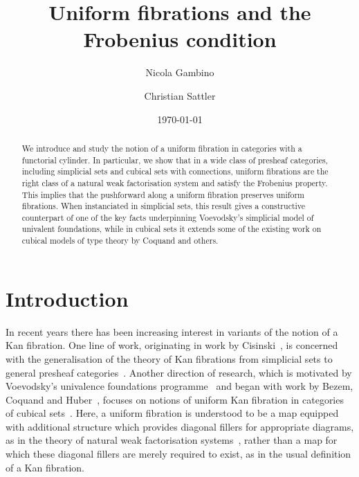 \documentclass[reqno,10pt,a4paper,oneside,draft]{amsart}
\title{Uniform fibrations and the Frobenius condition}
\begin{document}
\begin{abstract}
We introduce and study the notion of a uniform fibration in categories with a functorial cylinder.
In particular, we show that in a wide class of presheaf categories, including simplicial sets and cubical sets with connections, uniform fibrations are the right class of a natural weak factorisation system and satisfy the Frobenius property.
This implies that the pushforward along a uniform fibration preserves uniform fibrations.
When instanciated in simplicial sets, this result gives a constructive counterpart of one of the key facts underpinning Voevodsky's simplicial model of univalent foundations, while in cubical sets it extends some of the existing work on cubical models of type theory
by Coquand and others.
\end{abstract}

\author{Nicola Gambino}
\address{School of Mathematics, University of Leeds, Leeds LS2 9JT, UK}

\author{Christian Sattler}
\address{School of Mathematics, University of Leeds, Leeds LS2 9JT, UK}

\date{\today}

\maketitle




\section*{Introduction}

In recent years there has been increasing interest in variants of the notion of a Kan fibration.
One line of work, originating in work by Cisinski~\cite{cisinski-asterisque}, is concerned with the generalisation of the theory of Kan fibrations from simplicial sets to general presheaf categories~\cite{cisinski-univalence,moerdijk-minimal}.
Another direction of research, which is motivated by Voevodsky's univalence foundations programme~\cite{voevodsky:uf} and began with work by Bezem, Coquand and Huber~\cite{coquand-cubical-sets}, focuses on notions of uniform Kan fibration in categories of cubical sets~\cite{awodey-cubical,coquand-variation,huber-thesis,pitts-cubical-nominal,swan-awfs}.
Here, a uniform fibration is understood to be a map equipped with additional structure which provides diagonal fillers for appropriate diagrams, as in the theory of natural weak factorisation systems~\cite{grandis-tholen-nwfs}, rather than a map for which 
these diagonal fillers are merely required to exist, as in the usual definition of a Kan fibration.
\end{document}

